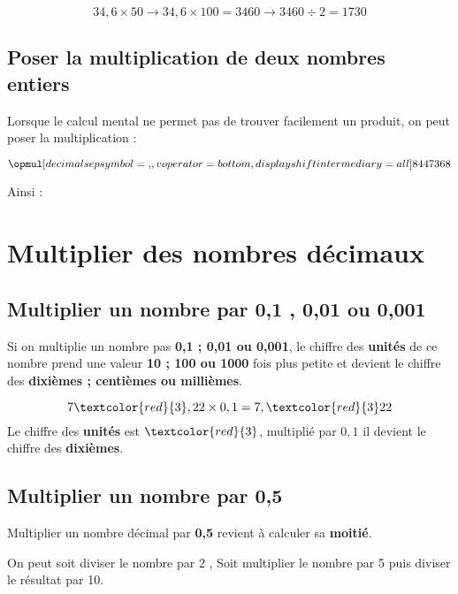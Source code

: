 \begin{pageCours}
\begin{Ex}
 \[34,6\times50\rightarrow34,6\times100=3460
 \rightarrow3460\div2=1730\]
\end{Ex}

\subsection{Poser la multiplication de deux nombres entiers}

Lorsque le calcul mental ne permet pas de trouver facilement un produit, on peut poser la multiplication :

\begin{Ex}
\[\opmul[decimalsepsymbol={,},
voperator=bottom,
displayshiftintermediary=all]{8447}{368}\]

Ainsi : 
\end{Ex}

\section{Multiplier des nombres décimaux}

\subsection{Multiplier un nombre par 0,1 , 0,01 ou 0,001}

\begin{Mt}
Si on multiplie un nombre pas \textbf{0,1 ; 0,01 ou 0,001}, le chiffre des \textbf{unités} de ce nombre prend une valeur \textbf{10 ; 100 ou 1000} fois plus petite et devient le chiffre des \textbf{dixièmes ; centièmes ou millièmes}.
\end{Mt}

\begin{Ex}
\[7\textcolor{red}{3},22\times0,1=7,\textcolor{red}{3}22\]
Le chiffre des \textbf{unités} est $\textcolor{red}{3}$, multiplié par $0,1$ il devient le chiffre des \textbf{dixièmes}.
\end{Ex} 

\subsection{Multiplier un nombre par 0,5}

\begin{Mt}
Multiplier un nombre décimal par \textbf{0,5} revient à calculer sa \textbf{moitié}.

On peut soit diviser le nombre par 2 , Soit multiplier le nombre par 5 puis diviser le résultat par 10.
\end{Mt}


\end{pageCours}
